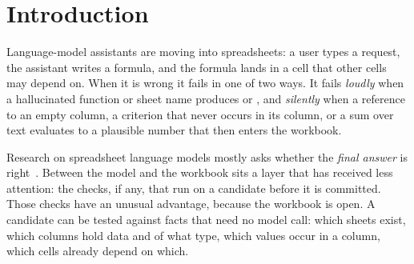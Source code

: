 \section{Introduction}
\label{sec:intro}

Language-model assistants are moving into spreadsheets: a user types a request, the assistant writes a formula, and the formula lands in a cell that other cells may depend on. When it is wrong it fails in one of two ways. It fails \emph{loudly} when a hallucinated function or sheet name produces  or , and \emph{silently} when a reference to an empty column, a criterion that never occurs in its column, or a sum over text evaluates to a plausible number that then enters the workbook.

Research on spreadsheet language models mostly asks whether the \emph{final answer} is right~\cite{zhao2024nl2formula,li2023sheetcopilot,ma2024spreadsheetbench,zhu2026spreadsheetbench2}. Between the model and the workbook sits a layer that has received less attention: the checks, if any, that run on a candidate before it is committed. Those checks have an unusual advantage, because the workbook is open. A candidate can be tested against facts that need no model call: which sheets exist, which columns hold data and of what type, which values occur in a column, which cells already depend on which.

